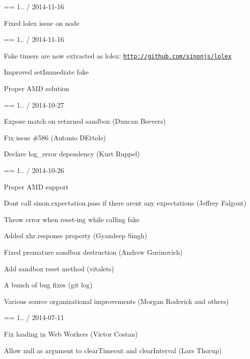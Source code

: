 == 1.. / 2014-\/11-\/16
\begin{DoxyItemize}
\item Fixed lolex issue on node
\end{DoxyItemize}

== 1.. / 2014-\/11-\/16
\begin{DoxyItemize}
\item Fake timers are now extracted as lolex\+: \href{http://github.com/sinonjs/lolex}{\tt http\+://github.\+com/sinonjs/lolex}
\item Improved set\+Immediate fake
\item Proper A\+MD solution
\end{DoxyItemize}

== 1.. / 2014-\/10-\/27


\begin{DoxyItemize}
\item Expose match on returned sandbox (Duncan Beevers)
\item Fix issue \#586 (Antonio D\textquotesingle{}Ettole)
\item Declare log\+\_\+error dependency (Kurt Ruppel)
\end{DoxyItemize}

== 1.. / 2014-\/10-\/26


\begin{DoxyItemize}
\item Proper A\+MD support
\item Don\textquotesingle{}t call sinon.\+expectation.\+pass if there aren\textquotesingle{}t any expectations (Jeffrey Falgout)
\item Throw error when reset-\/ing while calling fake
\item Added xhr.\+response property (Gyandeep Singh)
\item Fixed premature sandbox destruction (Andrew Gurinovich)
\item Add sandbox reset method (vitalets)
\item A bunch of bug fixes (git log)
\item Various source organizational improvements (Morgan Roderick and others)
\end{DoxyItemize}

== 1.. / 2014-\/07-\/11


\begin{DoxyItemize}
\item Fix loading in Web Workers (Victor Costan)
\item Allow null as argument to clear\+Timeout and clear\+Interval (Lars Thorup)
\end{DoxyItemize}

